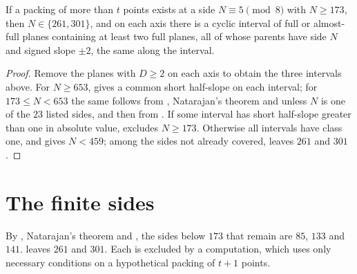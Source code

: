 \documentclass[11pt,colorlinks]{charlie}
\begin{document}
\begin{theorem}\label{thm:cutoff}
If a packing of more than $t$ points exists at a side $N\equiv5\pmod8$ with $N\ge173$, then $N\in\{261,301\}$, and on each axis there is a cyclic interval of full or almost-full planes containing at least two full planes, all of whose parents have side $N$ and signed slope $\pm2$, the same along the interval.
\end{theorem}

\begin{proof}
Remove the planes with $D\ge2$ on each axis to obtain the three intervals above. For $N\ge653$,  gives a common short half-slope on each interval; for $173\le N<653$ the same follows from , Natarajan's theorem and \cite[Theorem~1]{BHN} unless $N$ is one of the $23$ listed sides, and then from . If some interval has short half-slope greater than one in absolute value,  excludes $N\ge173$. Otherwise all intervals have class one, and  gives $N<459$; among the sides not already covered,  leaves $261$ and $301$.
\end{proof}

\section{The finite sides}\label{sec:finite}

By \cite[Theorem~1]{BHN}, Natarajan's theorem and , the sides below $173$ that remain are $85$, $133$ and $141$.  leaves $261$ and $301$. Each is excluded by a computation, which uses only necessary conditions on a hypothetical packing of $t+1$ points.
\end{document}
